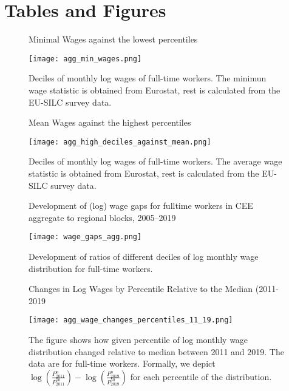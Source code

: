 \documentclass{article}
\begin{document}
\section{Tables and Figures}


\begin{figure}[!htbp]%
    \centering
    \caption{Minimal Wages against the lowest percentiles}
    {\texttt{[image: agg\_min\_wages.png]} }
    \label{low_deciles_vs_min_w}
    \caption*{\footnotesize Deciles of monthly log wages of full-time workers. The minimun wage statistic is obtained from Eurostat, rest is calculated from the EU-SILC survey data.}
\end{figure}

\begin{figure}[!htbp]%
    \centering
    \caption{Mean Wages against the highest percentiles}
    {\texttt{[image: agg\_high\_deciles\_against\_mean.png]} }
    \label{high_deciles_vs_meam_w}
    \caption*{\footnotesize Deciles of monthly log wages of full-time workers. The average wage statistic is obtained from Eurostat, rest is calculated from the EU-SILC survey data.}
\end{figure}



\begin{figure}[!htbp]%
    \centering
    \caption{Development of (log) wage gaps for fulltime workers in CEE aggregate to regional blocks,  2005–2019}
    {\texttt{[image: wage\_gaps\_agg.png]} }
    \label{agg_wage_gaps_CEE}
    \caption*{\footnotesize Development of ratios of different deciles of log monthly wage distribution for full-time workers. }
\end{figure}



\begin{figure}[!htbp]%
    \centering
    \caption{Changes in Log Wages by Percentile Relative to the Median (2011-2019}
    {\texttt{[image: agg\_wage\_changes\_percentiles\_11\_19.png]} }
    \label{agg_wage_changes_percentiles_11_19}
    \caption*{\footnotesize The figure shows how given percentile of log monthly wage distribution changed relative to median between 2011 and 2019. The data are for full-time workers. Formally, we depict $\log(\frac{P_{2011}^{n}}{P_{2011}^{50}}) - \log(\frac{P_{2019}^{n}}{P_{2019}^{50}})$ for each percentile of the distribution.} 
\end{figure}
\end{document}
